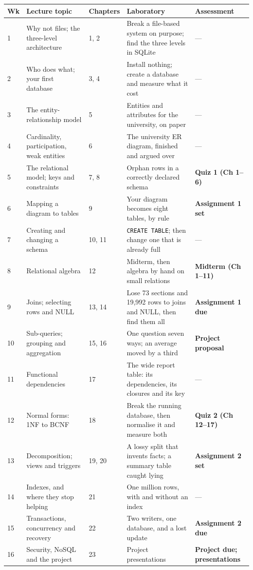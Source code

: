 \begin{longtable}{@{}L{1.1cm}L{3.2cm}L{1.8cm}L{4.4cm}L{3.9cm}@{}}
\toprule
{}
\textbf{Wk} & \textbf{Lecture topic} & \textbf{Chapters} & \textbf{Laboratory} &
\textbf{Assessment} \\
\midrule
{} & Why not files; the three-level architecture & 1, 2 & Break a file-based
system on purpose; find the three levels in SQLite & --- \\
2 & Who does what; your first database & 3, 4 & Install nothing; create a
database and measure what it cost & --- \\
3 & The entity-relationship model & 5 & Entities and attributes for the
university, on paper & --- \\
4 & Cardinality, participation, weak entities & 6 & The university ER diagram,
finished and argued over & --- \\
5 & The relational model; keys and constraints & 7, 8 & Orphan rows in a
correctly declared schema & \textbf{Quiz 1 (Ch 1--6)} \\
6 & Mapping a diagram to tables & 9 & Your diagram becomes eight tables, by
rule & \textbf{Assignment 1 set} \\
7 & Creating and changing a schema & 10, 11 & \texttt{CREATE TABLE}; then
change one that is already full & --- \\
8 & Relational algebra & 12 & Midterm, then algebra by hand on small relations
& \textbf{Midterm (Ch 1--11)} \\
9 & Joins; selecting rows and NULL & 13, 14 & Lose 73 sections and 19{,}992
rows to joins and NULL, then find them all & \textbf{Assignment 1 due} \\
10 & Sub-queries; grouping and aggregation & 15, 16 & One question seven ways;
an average moved by a third & \textbf{Project proposal} \\
11 & Functional dependencies & 17 & The wide report table: its dependencies,
its closures and its key & --- \\
12 & Normal forms: 1NF to BCNF & 18 & Break the running database, then
normalise it and measure both & \textbf{Quiz 2 (Ch 12--17)} \\
13 & Decomposition; views and triggers & 19, 20 & A lossy split that invents
facts; a summary table caught lying & \textbf{Assignment 2 set} \\
14 & Indexes, and where they stop helping & 21 & One million rows, with and
without an index & --- \\
15 & Transactions, concurrency and recovery & 22 & Two writers, one database,
and a lost update & \textbf{Assignment 2 due} \\
16 & Security, NoSQL and the project & 23 & Project presentations &
\textbf{Project due; presentations} \\
\bottomrule
\end{longtable}

